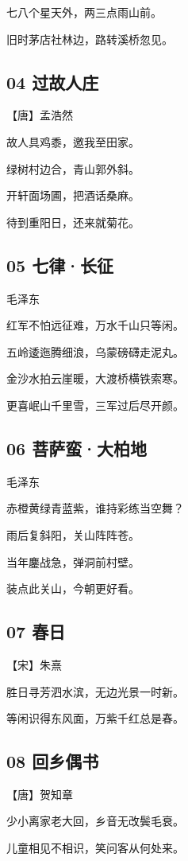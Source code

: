 \documentclass[a6paper, 12pt]{article}
\begin{document}
七八个星天外，两三点雨山前。

旧时茅店社林边，路转溪桥忽见。

\subsection*{04 过故人庄}

【唐】孟浩然
   
故人具鸡黍，邀我至田家。

绿树村边合，青山郭外斜。

开轩面场圃，把酒话桑麻。

待到重阳日，还来就菊花。

\subsection*{05 七律·长征}

毛泽东

红军不怕远征难，万水千山只等闲。

五岭逶迤腾细浪，乌蒙磅礴走泥丸。

金沙水拍云崖暖，大渡桥横铁索寒。

更喜岷山千里雪，三军过后尽开颜。

\subsection*{06 菩萨蛮·大柏地}

毛泽东

赤橙黄绿青蓝紫，谁持彩练当空舞？

雨后复斜阳，关山阵阵苍。

当年鏖战急，弹洞前村壁。

装点此关山，今朝更好看。

\subsection*{07 春日}

【宋】朱熹

胜日寻芳泗水滨，无边光景一时新。

等闲识得东风面，万紫千红总是春。

\subsection*{08 回乡偶书}

【唐】贺知章

少小离家老大回，乡音无改鬓毛衰。

儿童相见不相识，笑问客从何处来。
\end{document}
